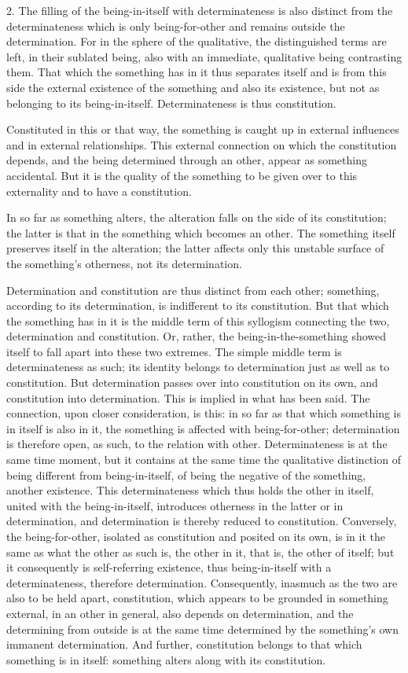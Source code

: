 2. The filling of the being-in-itself with determinateness is
also distinct from the determinateness which is only
being-for-other and remains outside the determination.
For in the sphere of the qualitative,
the distinguished terms are left, in their sublated being,
also with an immediate, qualitative being contrasting them.
That which the something has in it thus separates itself
and is from this side the external existence of
the something and also its existence,
but not as belonging to its being-in-itself.
Determinateness is thus constitution.

Constituted in this or that way,
the something is caught up in external influences
and in external relationships.
This external connection on which the constitution depends,
and the being determined through an other,
appear as something accidental.
But it is the quality of the something
to be given over to this externality
and to have a constitution.

In so far as something alters,
the alteration falls on the side of its constitution;
the latter is that in the something which becomes an other.
The something itself preserves itself in the alteration;
the latter affects only this unstable surface
of the something's otherness, not its determination.

Determination and constitution are thus distinct from each other;
something, according to its determination,
is indifferent to its constitution.
But that which the something has in it is
the middle term of this syllogism connecting the two,
determination and constitution.
Or, rather, the being-in-the-something showed itself
to fall apart into these two extremes.
The simple middle term is determinateness as such;
its identity belongs to determination
just as well as to constitution.
But determination passes over into constitution on its own,
and constitution into determination.
This is implied in what has been said.
The connection, upon closer consideration, is this:
in so far as that which something is in itself is also in it,
the something is affected with being-for-other;
determination is therefore open, as such,
to the relation with other.
Determinateness is at the same time moment,
but it contains at the same time the qualitative distinction
of being different from being-in-itself,
of being the negative of the something,
another existence.
This determinateness which thus holds the other in itself,
united with the being-in-itself,
introduces otherness in the latter or
in determination,
and determination is thereby reduced to constitution.
Conversely, the being-for-other, isolated as constitution
and posited on its own, is in it the same
as what the other as such is, the other in it,
that is, the other of itself;
but it consequently is self-referring existence,
thus being-in-itself with a determinateness, therefore determination.
Consequently, inasmuch as the two are also to be held apart,
constitution, which appears to be grounded in something external,
in an other in general, also depends on determination,
and the determining from outside is at the same time
determined by the something's own immanent determination.
And further, constitution belongs to that
which something is in itself:
something alters along with its constitution.

